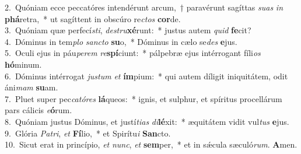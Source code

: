 {2.~}Quóniam ecce peccatóres intendérunt arcum,~† paravérunt sagíttas \textit{su}\textit{as} \textit{in} \textbf{phá}retra,~* ut sagíttent in obscúro re\textit{ctos} \textbf{cor}de.\\
{3.~}Quóniam quæ perfecí\textit{sti}, \textit{de}\textit{stru}\textbf{xé}runt:~* justus autem \textit{quid} \textbf{fe}cit?\\
{4.~}Dóminus in tem\textit{plo} \textit{san}\textit{cto} \textbf{su}o,~* Dóminus in cælo se\textit{des} \textbf{e}jus.\\
{5.~}Oculi ejus in páu\textit{pe}\textit{rem} \textit{re}\textbf{spí}ciunt:~* pálpebræ ejus intérrogant fíli\textit{os} \textbf{hó}minum.\\
{6.~}Dóminus intérrogat \textit{ju}\textit{stum} \textit{et} \textbf{ím}pium:~* qui autem díligit iniquitátem, odit áni\textit{mam} \textbf{su}am.\\
{7.~}Pluet super pec\textit{ca}\textit{tó}\textit{res} \textbf{lá}queos:~* ignis, et sulphur, et spíritus procellárum pars cálicis \textit{e}\textbf{ó}rum.\\
{8.~}Quóniam justus Dóminus, et justí\textit{ti}\textit{as} \textit{di}\textbf{lé}xit:~* æquitátem vidit vul\textit{tus} \textbf{e}jus.\\
{9.~}Glória \textit{Pa}\textit{tri}, \textit{et} \textbf{Fí}lio,~* et Spirítu\textit{i} \textbf{San}cto.\\
{10.~}Sicut erat in princípio, \textit{et} \textit{nunc}, \textit{et} \textbf{sem}per,~* et in sǽcula sæculó\textit{rum}. \textbf{A}men.\\

